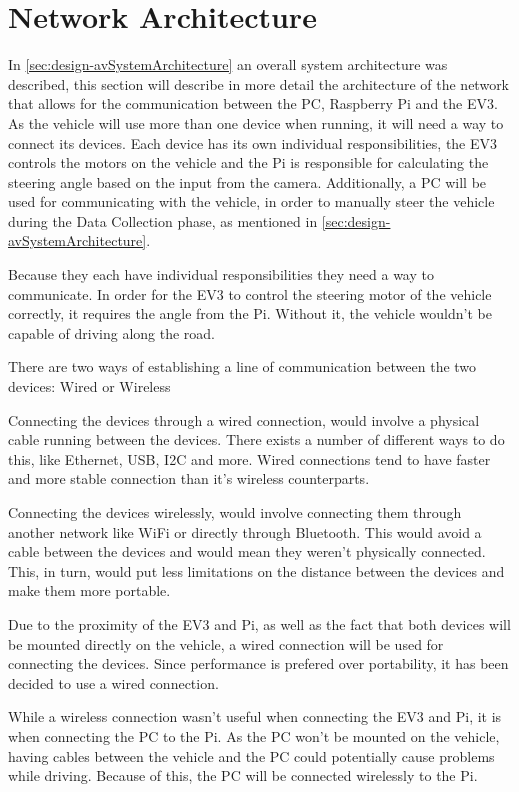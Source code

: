 \section{Network Architecture}\label{design:comPiEv3}
In \autoref{sec:design-avSystemArchitecture} an overall system architecture was described, this section will describe in more detail the architecture of the network that allows for the communication between the PC, Raspberry Pi and the EV3.
As the vehicle will use more than one device when running, it will need a way to connect its devices.
Each device has its own individual responsibilities, the EV3 controls the motors on the vehicle and the Pi is responsible for calculating the steering angle based on the input from the camera.
Additionally, a PC will be used for communicating with the vehicle, in order to manually steer the vehicle during the Data Collection phase, as mentioned in \autoref{sec:design-avSystemArchitecture}.

Because they each have individual responsibilities they need a way to communicate.
In order for the EV3 to control the steering motor of the vehicle correctly, it requires the angle from the Pi.
Without it, the vehicle wouldn't be capable of driving along the road.

There are two ways of establishing a line of communication between the two devices: Wired or Wireless

Connecting the devices through a wired connection, would involve a physical cable running between the devices.
There exists a number of different ways to do this, like Ethernet, USB, I2C and more.
Wired connections tend to have faster and more stable connection than it's wireless counterparts.

Connecting the devices wirelessly, would involve connecting them through another network like WiFi or directly through Bluetooth.
This would avoid a cable between the devices and would mean they weren't physically connected.
This, in turn, would put less limitations on the distance between the devices and make them more portable.

Due to the proximity of the EV3 and Pi, as well as the fact that both devices will be mounted directly on the vehicle, a wired connection will be used for connecting the devices.
Since performance is prefered over portability, it has been decided to use a wired connection.

While a wireless connection wasn't useful when connecting the EV3 and Pi, it is when connecting the PC to the Pi.
As the PC won't be mounted on the vehicle, having cables between the vehicle and the PC could potentially cause problems while driving.
Because of this, the PC will be connected wirelessly to the Pi.

